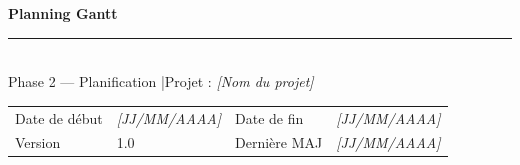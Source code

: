 \documentclass[11pt,a4paper,oneside]{report}
\begin{document}
\small

\begin{center}
{\LARGE\bfseries\color{cnNavy} Planning Gantt}\\[4pt]
\textcolor{cnOrange}{\rule{10cm}{1pt}}\\[4pt]
{\large\color{cnSlate} Phase 2 — Planification \quad|\quad Projet : \textit{[Nom du projet]}}
\end{center}

\vspace{4pt}
\renewcommand{\arraystretch}{1.4}
\begin{tabularx}{\textwidth}{L{3.5cm} Y L{3.5cm} Y}
\toprule
{} &  &  &  \\
\midrule
Date de début   & \textit{[JJ/MM/AAAA]}  & Date de fin    & \textit{[JJ/MM/AAAA]} \\
Version         & 1.0                     & Dernière MAJ   & \textit{[JJ/MM/AAAA]} \\
\bottomrule
\end{tabularx}

\vspace{8pt}
\end{document}
